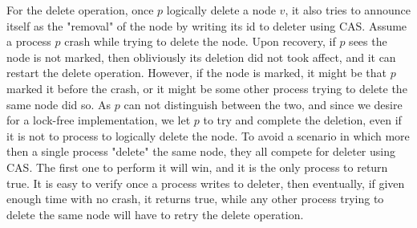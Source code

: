 For the delete operation, once $p$ logically delete a node $v$, it also tries to announce itself as the "removal" of the node by writing its id to deleter using CAS. Assume a process $p$ crash while trying to delete the node. Upon recovery, if $p$ sees the node is not marked, then obliviously its deletion did not took affect, and it can restart the delete operation. However, if the node is marked, it might be that $p$ marked it before the crash, or it might be some other process trying to delete the same node did so. As $p$ can not distinguish between the two, and since we desire for a lock-free implementation, we let $p$ to try and complete the deletion, even if it is not to process to logically delete the node. To avoid a scenario in which more then a single process "delete" the same node, they all compete for deleter using CAS. The first one to perform it will win, and it is the only process to return true. It is easy to verify once a process writes to deleter, then eventually, if given enough time with no crash, it returns true, while any other process trying to delete the same node will have to retry the delete operation.

 